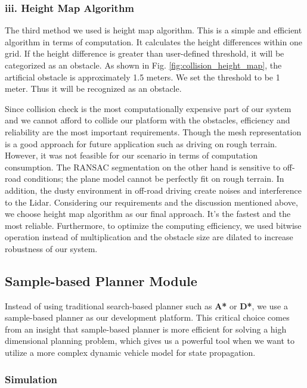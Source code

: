 \documentclass[../thesis.tex]{subfiles}
\begin{document}
\subsubsection{iii. Height Map Algorithm}
The third method we used is height map algorithm. This is a simple and efficient algorithm in terms of computation. It calculates the height differences within one grid. If the height difference is greater than user-defined threshold, it will be categorized as an obstacle. As shown in Fig. \ref{fig:collision_height_map}, the artificial obstacle is approximately 1.5 meters. We set the threshold to be 1 meter. Thus it will be recognized as an obstacle. 


Since collision check is the most computationally expensive part of our system and we cannot afford to collide our platform with the obstacles, efficiency and reliability are the most important requirements. Though the mesh representation is a good approach for future application such as driving on rough terrain. However, it was not feasible for our scenario in terms of computation consumption. The RANSAC segmentation on the other hand is sensitive to off-road conditions; the plane model cannot be perfectly fit on rough terrain. In addition, the dusty environment in off-road driving create noises and interference to the Lidar. Considering our requirements and the discussion mentioned above, we choose height map algorithm as our final approach. It’s the fastest and the most reliable. Furthermore, to optimize the computing efficiency, we used bitwise operation instead of multiplication and the obstacle size are dilated to increase robustness of our system. 

\subsection{Sample-based Planner Module}

Instead of using traditional search-based planner such as \textbf{A*} or \textbf{D*}, we use a sample-based planner as our development platform. This critical choice comes from an insight that sample-based planner is more efficient for solving a high dimensional planning problem, which gives us a powerful tool when we want to utilize a more complex dynamic vehicle model for state propagation. 

\subsubsection{Simulation}
\end{document}
